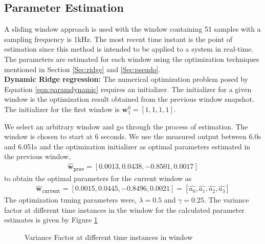 \documentclass[letterpaper%
, twoside%
, 12pt%
,memoire%
, english%
,creativecommons,hyperref%
]{thETS}
\theoremstyle{newThmStyle}
\begin{document}
\subsection{Parameter Estimation}
A sliding window approach is used with the window containing 51 samples with a sampling frequency is 1kHz. The most recent time instant is the point of estimation since this method is intended to be applied to a system in real-time. The parameters are estimated for each window using the  optimization techniques mentioned in Section \ref{Sec:ridge} and  \ref{Sec:pseudo}. \\
\textbf{Dynamic Ridge regression:} The numerical optimization problem posed by Equation \eqref{eqn:paramdynamic} requires an initializer. The initializer for a given window is the optimization result obtained from the previous window snapshot. The initializer for the first window is $\textbf{w}_{1}^{0}=[1,1,1,1]$. 

We select an arbitrary window and go through the process of estimation. The window is chosen to start at 6 seconds. We use the measured output between 6.0s and 6.051s and the optimization initializer as optimal parameters estimated in the previous window, 
\begin{align*}
\hat{\textbf{w}}_{\texttt{prev}}=[0.0013, 0.0438, -0.8501, 0.0017]
\end{align*} to obtain the optimal parameters for the current window as 
\begin{align} \label{eqn:example2}
\hat{\textbf{w}}_{\texttt{current}}=[0.0015, 0.0445, -0.8496, 0.0021] = [\hat{a_0}, \hat{a_1}, \hat{a_2}, \hat{a_3}]
\end{align}
The optimization tuning parameters were, $\lambda=0.5$ and $\gamma=0.25$. The variance factor at different time instances in the window for the calculated parameter estimates is given by Figure \ref{Fig:varFacWin}
\begin{figure}[H]
	\centering
	\parbox{0.75\textwidth}{\caption{Variance Factor at different time instances in window\label{Fig:varFacWin}}}
\end{figure}
\end{document}
